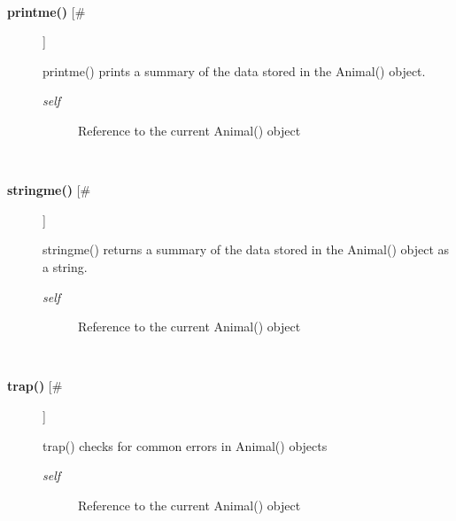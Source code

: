 \documentclass[10pt]{article}
\begin{document}
\begin{description}
\begin{description}
\end{description}
\\ 

\item[\textbf{printme()}
 [\#]]

 printme() prints a summary of the data stored in the Animal() object.
\begin{description}
\item[\emph{self}
] Reference to the current Animal() object

\end{description}
\\ 

\item[\textbf{stringme()}
 [\#]]

 stringme() returns a summary of the data stored in the Animal() object as a string.
\begin{description}
\item[\emph{self}
] Reference to the current Animal() object

\end{description}
\\ 

\item[\textbf{trap()}
 [\#]]

 trap() checks for common errors in Animal() objects
\begin{description}
\item[\emph{self}
] Reference to the current Animal() object

\end{description}
\\ 


\end{description}
\end{document}
